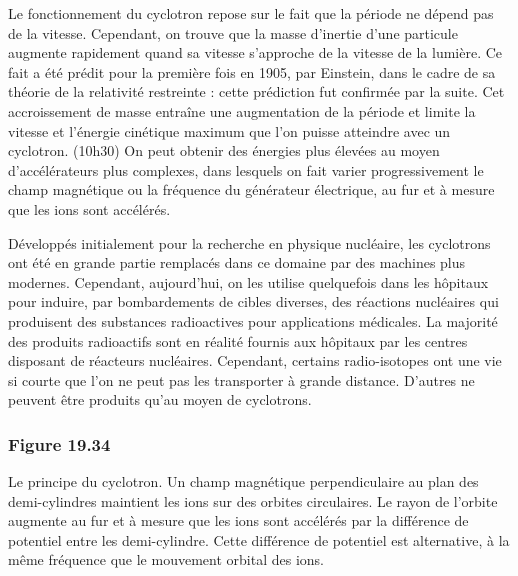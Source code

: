 \documentclass[../main.tex]{subfiles}
\begin{document}
\par Le fonctionnement du cyclotron repose sur le fait que la période ne dépend pas de la vitesse. Cependant, on trouve que la masse d'inertie d'une particule augmente rapidement quand sa vitesse s'approche de la vitesse de la lumière. Ce fait a été prédit pour la première fois en 1905, par Einstein, dans le cadre de sa théorie de la relativité restreinte : cette prédiction fut confirmée par la suite. Cet accroissement de masse entraîne une augmentation de la période et limite la vitesse et l'énergie cinétique maximum que l'on puisse atteindre avec un cyclotron. (10h30) On peut obtenir des énergies plus élevées au moyen d'accélérateurs plus complexes, dans lesquels on fait varier progressivement le champ magnétique ou la fréquence du générateur électrique, au fur et à mesure que les ions sont accélérés.\\
\par Développés initialement pour la recherche en physique nucléaire, les cyclotrons ont été en grande partie remplacés dans ce domaine par des machines plus modernes. Cependant, aujourd'hui, on les utilise quelquefois dans les hôpitaux pour induire, par bombardements de cibles diverses, des réactions nucléaires qui produisent des substances radioactives pour applications médicales. La majorité des produits radioactifs sont en réalité fournis aux hôpitaux par les centres disposant de réacteurs nucléaires. Cependant, certains radio-isotopes ont une vie si courte que l'on ne peut pas les transporter à grande distance. D'autres ne peuvent être produits qu'au moyen de cyclotrons.\\
\subsubsection*{Figure 19.34}
Le principe du cyclotron. Un champ magnétique perpendiculaire au plan des demi-cylindres maintient les ions sur des orbites circulaires. Le rayon de l'orbite augmente au fur et à mesure que les ions sont accélérés par la différence de potentiel entre les demi-cylindre. Cette différence de potentiel est alternative, à la même fréquence que le mouvement orbital des ions.
\end{document}
